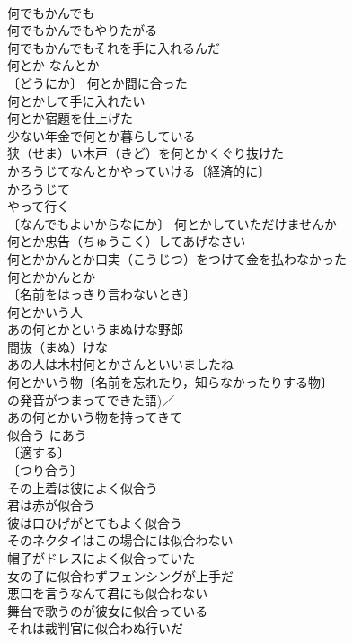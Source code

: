 \documentclass[8pt]{extreport}
\begin{document}
\begin{CJK}{UTF8}{min}
\\	何でもかんでも　
\\	何でもかんでもやりたがる 
\\	何でもかんでもそれを手に入れるんだ 
\\	何とか	なんとか	
\\	〔どうにか〕 何とか間に合った 
\\	何とかして手に入れたい 
\\	何とか宿題を仕上げた 
\\	少ない年金で何とか暮らしている 
\\	狭（せま）い木戸（きど）を何とかくぐり抜けた 
\\	かろうじてなんとかやっていける〔経済的に〕 
\\	かろうじて　
\\	やって行く　
\\	〔なんでもよいからなにか〕 何とかしていただけませんか 
\\	何とか忠告（ちゅうこく）してあげなさい 
\\	何とかかんとか口実（こうじつ）をつけて金を払わなかった 
\\	何とかかんとか　
\\	〔名前をはっきり言わないとき〕　
\\	何とかいう人 
\\	あの何とかというまぬけな野郎 
\\	間抜（まぬ）けな　
\\	あの人は木村何とかさんといいましたね 
\\	何とかいう物〔名前を忘れたり，知らなかったりする物〕 
\\	の発音がつまってできた語)／
\\	あの何とかいう物を持ってきて 
\\	似合う	にあう	
\\	〔適する〕
\\	〔つり合う〕
\\	その上着は彼によく似合う 
\\	君は赤が似合う 
\\	彼は口ひげがとてもよく似合う 
\\	そのネクタイはこの場合には似合わない 
\\	帽子がドレスによく似合っていた 
\\	女の子に似合わずフェンシングが上手だ 
\\	悪口を言うなんて君にも似合わない 
\\	舞台で歌うのが彼女に似合っている 
\\	それは裁判官に似合わぬ行いだ 

\end{CJK}
\end{document}
